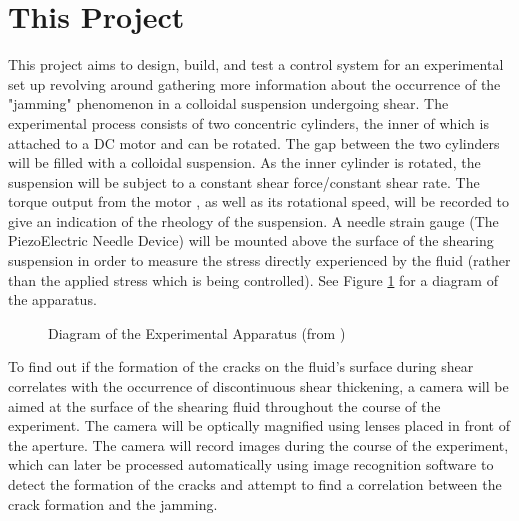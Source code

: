 \documentclass[a4]{report}
\begin{document}
	\section{This Project}
	This project aims to design, build, and test a control system for an experimental set up revolving around gathering more information about the occurrence of the "jamming" phenomenon in a colloidal suspension undergoing shear. The experimental process consists of two concentric cylinders, the inner of which is attached to a DC motor and can be rotated. The gap between the two cylinders will be filled with a colloidal suspension. As the inner cylinder is rotated, the suspension will be subject to a constant shear force/constant shear rate. The torque output from the motor , as well as its rotational speed, will be recorded to give an indication of the rheology of the suspension. A needle strain gauge (The PiezoElectric Needle Device) will be mounted above the surface of the shearing suspension in order to measure the stress directly experienced by the fluid (rather than the applied stress which is being controlled). See Figure \ref{expdia} for a diagram of the apparatus.\newline
	\begin{figure}[!h]
	\centering
	\caption{Diagram of the Experimental Apparatus (from )}
	\label{expdia}
	\end{figure} \newline  \noindent
	To find out if the formation of the cracks on the fluid's surface during shear correlates with the occurrence of discontinuous shear thickening, a camera will be aimed at the surface of the shearing fluid throughout the course of the experiment. The camera will be optically magnified using lenses placed in front of the aperture. The camera will record images during the course of the experiment, which can later be processed automatically using image recognition software to detect the formation of the cracks and attempt to find a correlation between the crack formation and the jamming. \newline \newline \noindent
\end{document}
